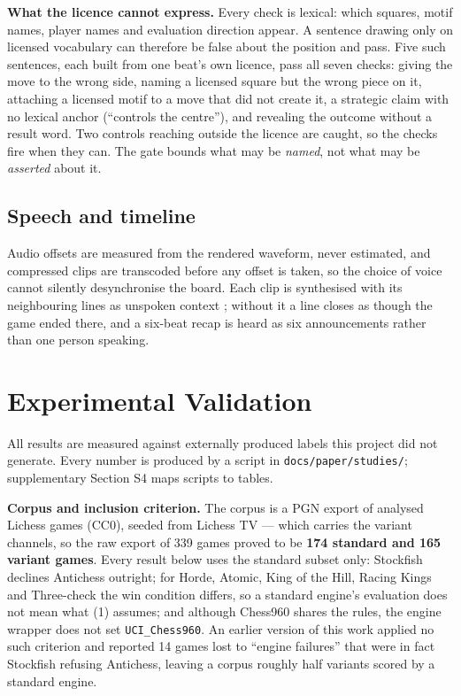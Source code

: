 \documentclass[conference]{IEEEtran}
\begin{document}
\textbf{What the licence cannot express.} Every check is lexical: which
squares, motif names, player names and evaluation direction appear. A
sentence drawing only on licensed vocabulary can therefore be false about
the position and pass. Five such sentences, each built from one beat's own
licence, pass all seven checks: giving the move to the wrong side, naming a
licensed square but the wrong piece on it, attaching a licensed motif to a
move that did not create it, a strategic claim with no lexical anchor
(``controls the centre''), and revealing the outcome without a result word.
Two controls reaching outside the licence are caught, so the checks fire
when they can. The gate bounds what may be \emph{named}, not what may be
\emph{asserted} about it.

\subsection{Speech and timeline}

Audio offsets are measured from the rendered waveform, never estimated, and
compressed clips are transcoded before any offset is taken, so the choice of
voice cannot silently desynchronise the board. Each clip is synthesised with
its neighbouring lines as unspoken context \cite{xu2021}; without it a line
closes as though the game ended there, and a six-beat recap is heard as six
announcements rather than one person speaking.

\section{Experimental Validation}

All results are measured against externally produced labels this project did
not generate. Every number is produced by a script in
\texttt{docs/paper/studies/}; supplementary Section S4 maps scripts to
tables.

\textbf{Corpus and inclusion criterion.} The corpus is a PGN export of
analysed Lichess games (CC0), seeded from Lichess TV --- which carries the
variant channels, so the raw export of 339 games proved to be \textbf{174
standard and 165 variant games}. Every result below uses the standard subset
only: Stockfish declines Antichess outright; for Horde, Atomic, King of the
Hill, Racing Kings and Three-check the win condition differs, so a standard
engine's evaluation does not mean what (1) assumes; and although Chess960
shares the rules, the engine wrapper does not set \texttt{UCI\_Chess960}. An
earlier version of this work applied no such criterion and reported 14 games
lost to ``engine failures'' that were in fact Stockfish refusing Antichess,
leaving a corpus roughly half variants scored by a standard engine.
\end{document}
